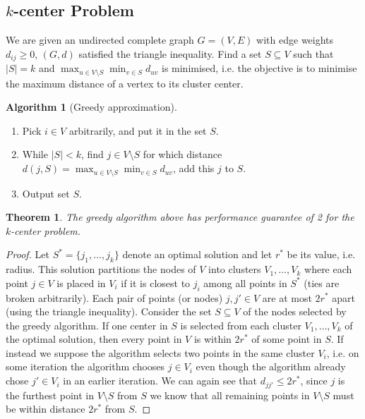 \documentclass{article}
\newtheorem*{thm}{Theorem}
\theoremstyle{definition}
\newtheorem*{alg}{Algorithm}
\begin{document}
\subsection{$k$-center Problem}
We are given an undirected complete graph $G=(V,E)$ with edge weights $d_{ij} \ge 0$, $(G,d)$ satisfied the triangle inequality.
Find a set $S\subseteq V$ such that $|S| = k$ and $\max_{u\in V\setminus S}\min_{v\in S} d_{uv}$ is minimised, i.e. the objective is to minimise the maximum distance of a vertex to its cluster center.

\begin{alg}[Greedy approximation]~
\begin{enumerate}
\item Pick $i\in V$ arbitrarily, and put it in the set $S$.
\item While $|S| < k$, find $j\in V\setminus S$ for which distance $\displaystyle d(j,S) =\max_{u\in V\setminus S}\min_{v\in S} d_{uv}$, add this $j$ to $S$.
\item Output set $S$.
\end{enumerate}
\end{alg}

\begin{thm}
The greedy algorithm above has performance guarantee of 2 for the $k$-center problem.
\end{thm}
\begin{proof}
Let $S^*=\{j_1,\ldots,j_k\}$ denote an optimal solution and let $r^*$ be its value, i.e. radius.
This solution partitions the nodes of $V$ into clusters $V_1,\ldots,V_k$ where each point $j\in V$ is placed in $V_i$ if it is closest to $j_i$ among all points in $S^*$ (ties are broken arbitrarily).
Each pair of points (or nodes) $j,j'\in V$ are at most $2r^*$ apart (using the triangle inequality).
Consider the set $S\subseteq V$ of the nodes selected by the greedy algorithm.
If one center in $S$ is selected from each cluster $V_1,\ldots,V_k$ of the optimal solution, then every point in $V$ is within $2r^*$ of some point in $S$.
If instead we suppose the algorithm selects two points in the same cluster $V_i$, i.e. on some iteration the algorithm chooses $j\in V_i$ even though the algorithm already chose $j'\in V_i$ in an earlier iteration.
We can again see that $d_{jj'}\le 2r^*$, since $j$ is the furthest point in $V\setminus S$ from $S$ we know that all remaining points in $V\setminus S$ must be within distance $2r^*$ from $S$.
\end{proof}

\end{document}
